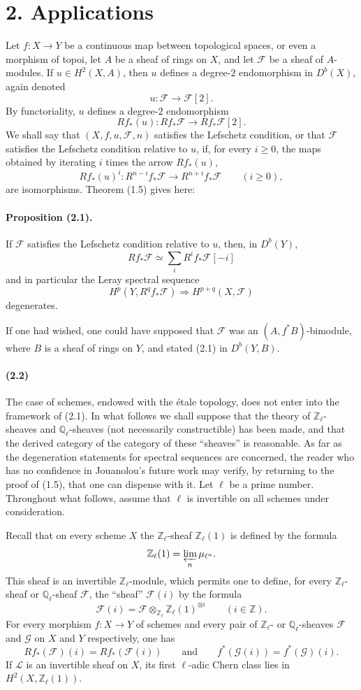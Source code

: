 \documentclass[10pt]{article}
\newcommand{\Fcal}{\mathcal F}
\newcommand{\Gcal}{\mathcal G}
\newcommand{\Z}{\mathbb Z}
\newcommand{\Q}{\mathbb Q}
\begin{document}
\section*{2. Applications}

Let $f:X\to Y$ be a continuous map between topological spaces, or even a morphism of topoi, let $A$ be a sheaf of rings on $X$, and let $\Fcal$ be a sheaf of $A$-modules. If $u\in H^2(X,A)$, then $u$ defines a degree-$2$ endomorphism in $D^b(X)$, again denoted
\[
u:\Fcal\longrightarrow\Fcal[2].
\]
By functoriality, $u$ defines a degree-$2$ endomorphism
\[
Rf_*(u):Rf_*\Fcal\longrightarrow Rf_*\Fcal[2].
\]
We shall say that $(X,f,u,\Fcal,n)$ satisfies the Lefschetz condition, or that $\Fcal$ satisfies the Lefschetz condition relative to $u$, if, for every $i\ge0$, the maps obtained by iterating $i$ times the arrow $Rf_*(u)$,
\[
Rf_*(u)^i:R^{n-i}f_*\Fcal\longrightarrow R^{n+i}f_*\Fcal\qquad(i\ge0),
\]
are isomorphisms. Theorem (1.5) gives here:

\paragraph{Proposition (2.1).} If $\Fcal$ satisfies the Lefschetz condition relative to $u$, then, in $D^b(Y)$,
\[
Rf_*\Fcal\simeq\sum_iR^if_*\Fcal[-i]
\]
and in particular the Leray spectral sequence
\[
H^p(Y,R^qf_*\Fcal)\Longrightarrow H^{p+q}(X,\Fcal)
\]
degenerates.

If one had wished, one could have supposed that $\Fcal$ was an $(A,f^*B)$-bimodule, where $B$ is a sheaf of rings on $Y$, and stated (2.1) in $D^b(Y,B)$.

\paragraph{(2.2)} The case of schemes, endowed with the étale topology, does not enter into the framework of (2.1). In what follows we shall suppose that the theory of $\Z_\ell$-sheaves and $\Q_\ell$-sheaves (not necessarily constructible) has been made, and that the derived category of the category of these ``sheaves'' is reasonable. As far as the degeneration statements for spectral sequences are concerned, the reader who has no confidence in Jouanolou's future work may verify, by returning to the proof of (1.5), that one can dispense with it. Let $\ell$ be a prime number. Throughout what follows, assume that $\ell$ is invertible on all schemes under consideration.

Recall that on every scheme $X$ the $\Z_\ell$-sheaf $\Z_\ell(1)$ is defined by the formula
\[
\Z_\ell(1)=\varprojlim_n\mu_{\ell^n}.
\]
This sheaf is an invertible $\Z_\ell$-module, which permits one to define, for every $\Z_\ell$-sheaf or $\Q_\ell$-sheaf $\Fcal$, the ``sheaf'' $\Fcal(i)$ by the formula
\[
\Fcal(i)=\Fcal\otimes_{\Z_\ell}\Z_\ell(1)^{\otimes i}\qquad(i\in\Z).
\]
For every morphism $f:X\to Y$ of schemes and every pair of $\Z_\ell$- or $\Q_\ell$-sheaves $\Fcal$ and $\Gcal$ on $X$ and $Y$ respectively, one has
\[
\tag{2.3}
Rf_*(\Fcal)(i)=Rf_*(\Fcal(i))\qquad\text{and}\qquad f^*(\Gcal(i))=f^*(\Gcal)(i).
\]
If $\mathcal L$ is an invertible sheaf on $X$, its first $\ell$-adic Chern class lies in $H^2(X,\Z_\ell(1))$.
\end{document}
